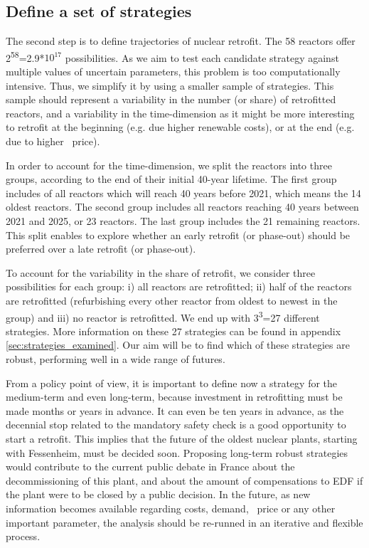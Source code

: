 \subsection{Define a set of strategies}

The second step is to define trajectories of nuclear retrofit. The 58 reactors offer 2\textsuperscript{58}=2.9*$10^{17}$ possibilities. As we aim to test each candidate strategy against multiple values of uncertain parameters, this problem is too computationally intensive. Thus, we simplify it by using a smaller sample of strategies. This sample should represent a variability in the number (or share) of retrofitted reactors, and a variability in the time-dimension as it might be more interesting to retrofit at the beginning (e.g. due higher renewable costs), or at the end (e.g. due to higher \coo\ price).

In order to account for the time-dimension, we split the reactors into three groups, according to the end of their initial 40-year lifetime. The first group includes of all reactors which will reach 40 years before 2021, which means the 14 oldest reactors. The second group includes all reactors reaching 40 years between 2021 and 2025, or 23 reactors. The last group includes the 21 remaining reactors. This split enables to explore whether an early retrofit (or phase-out) should be preferred over a late retrofit (or phase-out). 

To account for the variability in the share of retrofit, we consider three possibilities for each group: i) all reactors are retrofitted; ii) half of the reactors are retrofitted (refurbishing every other reactor from oldest to newest in the group) and iii) no reactor is retrofitted. We end up with 3\textsuperscript{3}=27 different strategies. 
More information on these 27 strategies can be found in appendix \ref{sec:strategies_examined}. Our aim will be to find which of these strategies are robust, performing well in a wide range of futures. 

From a policy point of view, it is important to define now a strategy for the medium-term and even long-term, because investment in retrofitting must be made months or years in advance. It can even be ten years in advance, as the decennial stop related to the mandatory safety check is a good opportunity to start a retrofit. 
This implies that the future of the oldest nuclear plants, starting with Fessenheim, must be decided soon. 
Proposing long-term robust strategies would contribute to the current public debate in France about the decommissioning of this plant, and about the amount of compensations to EDF if the plant were to be closed by a public decision.
In the future, as new information becomes available regarding costs, demand, \coo\ price or any other important parameter, the analysis should be re-runned in an iterative and flexible process.

